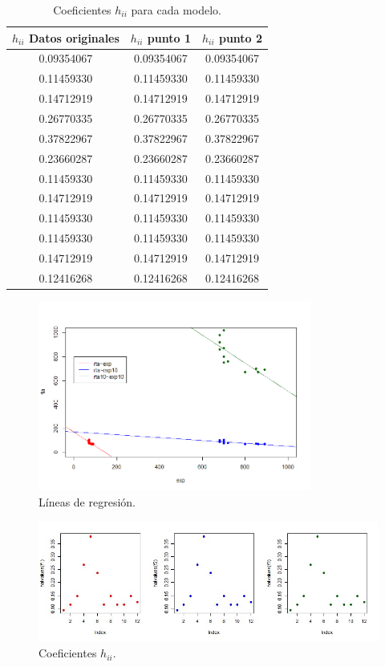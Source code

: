 \documentclass[a4paper]{article}
\begin{document}
\begin{table}
    \centering
    \begin{tabular}{c c c}
    $h_{ii}$ Datos originales & $h_{ii}$ punto 1 &  $h_{ii}$ punto 2 \\ \hline
    0.09354067 & 0.09354067 & 0.09354067 \\
    0.11459330 & 0.11459330 & 0.11459330 \\
    0.14712919 & 0.14712919 & 0.14712919 \\
    0.26770335 &0.26770335 &0.26770335 \\
    0.37822967 &0.37822967 &0.37822967 \\
    0.23660287 &0.23660287 &0.23660287 \\
    0.11459330 &0.11459330 &0.11459330 \\
    0.14712919 &0.14712919 &0.14712919 \\
    0.11459330 &0.11459330 &0.11459330 \\
    0.11459330 &0.11459330 &0.11459330 \\
    0.14712919 &0.14712919 &0.14712919 \\
    0.12416268 & 0.12416268 &0.12416268\\
    \end{tabular}
    \caption{\label{tab:52}Coeficientes $h_{ii}$ para cada modelo.}
\end{table}
\begin{figure}
\centering
\includegraphics[width=0.8\textwidth]{5_1.png}
\caption{\label{fig:f51}Líneas de regresión.}
\end{figure}
\begin{figure}
\centering
\includegraphics[width=1\textwidth]{5_2.jpg}
\caption{\label{fig:f52}Coeficientes $h_{ii}$.}
\end{figure}
\end{document}
